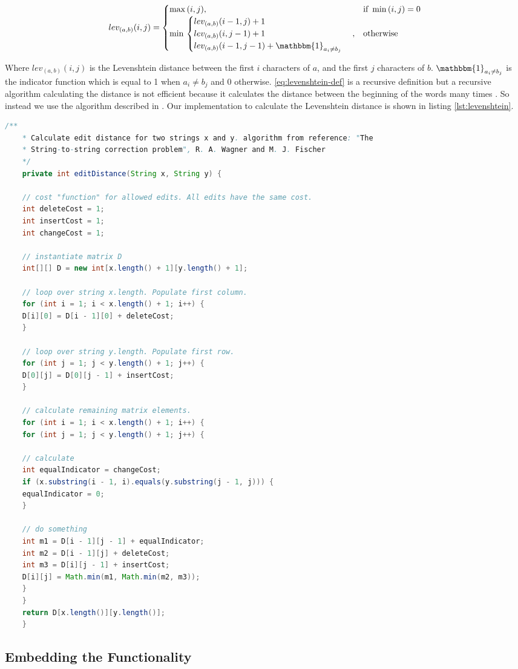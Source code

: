 \begin{equation}  
lev_{(a,b)}(i,j) = 
	\begin{cases} 
		\max{(i,j)}, & \text{if}\ \min{(i,j) = 0} \\
		\min{} \begin{cases}
					lev_{(a,b)}(i-1,j) + 1 \\
					lev_{(a,b)}(i,j-1) + 1 \\
					lev_{(a,b)}(i-1,j-1) + \mathbbm{1}_{a_{i} \neq b_{j}} \\
				\end{cases} , & \text{otherwise}
	\end{cases}
\label{eq:levenshtein-def}
\end{equation}

Where \(lev_{(a,b)}(i,j)\) is the Levenshtein distance between the first \(i\) characters of \(a\), and the first \(j\) characters of \(b\). \(\mathbbm{1}_{a_{i} \neq b_{j}}\) is the indicator function which is equal to 1 when \(a_{i} \neq b_{j}\) and 0 otherwise.
\eqref{eq:levenshtein-def} is a recursive definition but a recursive algorithm calculating the distance is not efficient because it calculates the distance between the beginning of the words many times \cite{wikiLeven}. So instead we use the algorithm described in \cite{WF1974}. Our implementation to calculate the Levenshtein distance is shown in listing \ref{lst:levenshtein}.
 
\begin{lstlisting}[language=Java, caption=This is a code example., label=lst:2-gram]
	/**
	* Calculate edit distance for two strings x and y. algorithm from reference: "The
	* String-to-string correction problem", R. A. Wagner and M. J. Fischer
	*/
	private int editDistance(String x, String y) {
	
	// cost "function" for allowed edits. All edits have the same cost.
	int deleteCost = 1;
	int insertCost = 1;
	int changeCost = 1;
	
	// instantiate matrix D
	int[][] D = new int[x.length() + 1][y.length() + 1];
	
	// loop over string x.length. Populate first column.
	for (int i = 1; i < x.length() + 1; i++) {
	D[i][0] = D[i - 1][0] + deleteCost;
	}
	
	// loop over string y.length. Populate first row.
	for (int j = 1; j < y.length() + 1; j++) {
	D[0][j] = D[0][j - 1] + insertCost;
	}
	
	// calculate remaining matrix elements.
	for (int i = 1; i < x.length() + 1; i++) {
	for (int j = 1; j < y.length() + 1; j++) {
	
	// calculate
	int equalIndicator = changeCost;
	if (x.substring(i - 1, i).equals(y.substring(j - 1, j))) {
	equalIndicator = 0;
	}
	
	// do something
	int m1 = D[i - 1][j - 1] + equalIndicator;
	int m2 = D[i - 1][j] + deleteCost;
	int m3 = D[i][j - 1] + insertCost;
	D[i][j] = Math.min(m1, Math.min(m2, m3));
	}
	}
	return D[x.length()][y.length()];
	}
\end{lstlisting}



\subsection{Embedding the Functionality}


